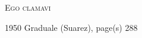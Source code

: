 \documentclass[10pt, letterpaper]{article}
\begin{document}
\newcommand{\red}[1]{\textcolor{red}{#1}}

\begin{center}\begin{huge}\textsc{Ego clamavi}\end{huge}\end{center}
\begin{center}1950 Graduale (Suarez), page(s) 288\end{center}


\def\greinitialformat#1{%
{\fontsize{31}{31}\selectfont #1}%
}

\gresetfirstlineaboveinitial{\small \textbf{}}{\small \textbf{}}
\commentary{{\small \textit{}}}

\grespaceabovelines=3mm

\end{document}
